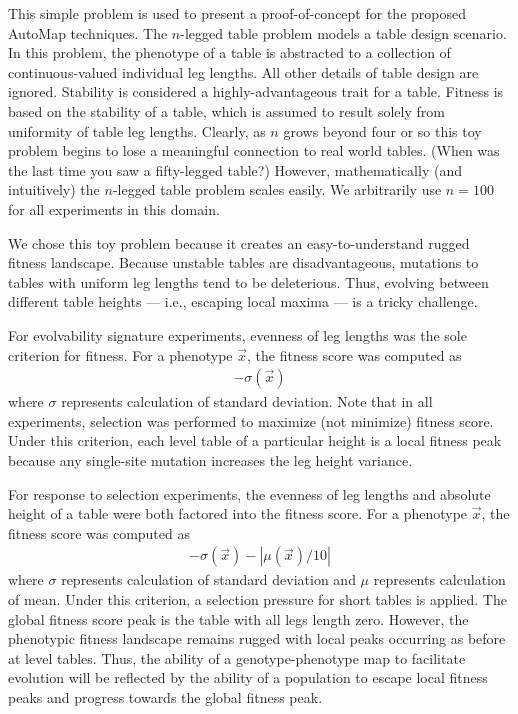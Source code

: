 This simple problem is used to present a proof-of-concept for the proposed AutoMap techniques.
The $n$-legged table problem models a table design scenario.
In this problem, the phenotype of a table is abstracted to a collection of continuous-valued individual leg lengths.
All other details of table design are ignored.
Stability is considered a highly-advantageous trait for a table.
Fitness is based on the stability of a table, which is assumed to result solely from uniformity of table leg lengths.
Clearly, as $n$ grows beyond four or so this toy problem begins to lose a meaningful connection to real world tables.
(When was the last time you saw a fifty-legged table?)
However, mathematically (and intuitively) the $n$-legged table problem scales easily.
We arbitrarily use $n=100$ for all experiments in this domain.

We chose this toy problem because it creates an easy-to-understand rugged fitness landscape.
Because unstable tables are disadvantageous, mutations to tables with uniform leg lengths tend to be deleterious.
Thus, evolving between different table heights --- i.e., escaping local maxima --- is a tricky challenge.

For evolvability signature experiments, evenness of leg lengths was the sole criterion for fitness.
For a phenotype $\vec{x}$, the fitness score was computed as
\begin{align*}
-\sigma(\vec{x})
\end{align*}
where $\sigma$ represents calculation of standard deviation.
Note that in all experiments, selection was performed to maximize (not minimize) fitness score.
Under this criterion, each level table of a particular height is a local fitness peak because any single-site mutation increases the leg height variance.

For response to selection experiments, the evenness of leg lengths and absolute height of a table were both factored into the fitness score.
For a phenotype $\vec{x}$, the fitness score was computed as
\begin{align*}
-\sigma(\vec{x}) - |\mu(\vec{x})/10|
\end{align*}
where $\sigma$ represents calculation of standard deviation and $\mu$ represents calculation of mean.
Under this criterion, a selection pressure for short tables is applied.
The global fitness score peak is the table with all legs length zero.
However, the phenotypic fitness landscape remains rugged with local peaks occurring as before at level tables.
Thus, the ability of a genotype-phenotype map to facilitate evolution will be reflected by the ability of a population to escape local fitness peaks and progress towards the global fitness peak.

